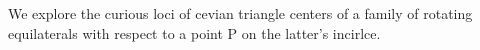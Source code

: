 We explore the curious loci of cevian triangle centers of a family of rotating equilaterals with respect to a point P on the latter's incirlce.
